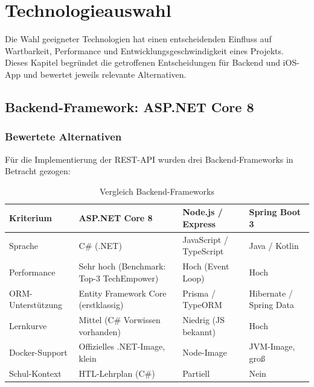 \chapter{Technologieauswahl}
\label{chap:technologie}

Die Wahl geeigneter Technologien hat einen entscheidenden Einfluss auf Wartbarkeit,
Performance und Entwicklungsgeschwindigkeit eines Projekts. Dieses Kapitel begründet die
getroffenen Entscheidungen für Backend und iOS-App und bewertet jeweils relevante
Alternativen.

\section{Backend-Framework: ASP.NET Core 8}
\label{sec:aspnet}

\subsection{Bewertete Alternativen}
\label{subsec:backend-alternativen}

Für die Implementierung der REST-API wurden drei Backend-Frameworks in Betracht gezogen:

\begin{table}[H]
  \centering
  \caption{Vergleich Backend-Frameworks}
  \label{tab:backend-vergleich}
  \small
  \begin{tabularx}{\textwidth}{|l|Y|Y|Y|}
    \hline
    \textbf{Kriterium} & \textbf{ASP.NET Core 8} & \textbf{Node.js / Express} &
    \textbf{Spring Boot 3} \\
    \hline
    Sprache             & C\# (.NET)      & JavaScript / TypeScript & Java / Kotlin \\
    \hline
    Performance         & Sehr hoch (Benchmark: Top-3 TechEmpower) &
                          Hoch (Event Loop) & Hoch \\
    \hline
    ORM-Unterstützung   & Entity Framework Core (erstklassig) &
                          Prisma / TypeORM & Hibernate / Spring Data \\
    \hline
    Lernkurve           & Mittel (C\# Vorwissen vorhanden) &
                          Niedrig (JS bekannt) & Hoch \\
    \hline
    Docker-Support      & Offizielles .NET-Image, klein & Node-Image & JVM-Image, groß \\
    \hline
    Schul-Kontext       & HTL-Lehrplan (C\#) & Partiell & Nein \\
    \hline
  \end{tabularx}
\end{table}

